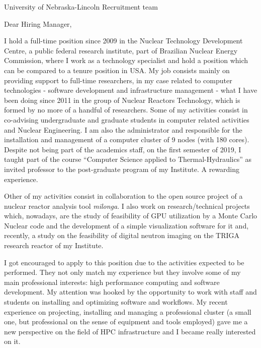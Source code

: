 \documentclass[11pt]{letter}
\begin{document}
\begin{letter}{University of Nebraska-Lincoln Recruitment team}

  \opening{Dear Hiring Manager,}
  
  I hold a full-time position since 2009 in the Nuclear Technology Development Centre, a public federal
  research institute, part of Brazilian Nuclear Energy Commission, where I work as a technology
  specialist and hold a position which can be compared to a tenure position in USA. My job consists mainly on
  providing support to full-time researchers, in my case
  related to computer technologies - software development and infrastructure management - what I have been
  doing since 2011 in the group of Nuclear Reactors Technology, which is formed by no more of a handful of researchers.
  Some of my activities consist in co-advising undergraduate and graduate students in computer related
  activities and Nuclear Engineering. I am also the administrator and responsible for the installation and management of a
  computer cluster of 9 nodes (with 180 cores). Despite not being part of the academics staff, on the first semester of 2019,
  I taught part of the course ``Computer Science applied to Thermal-Hydraulics'' as invited professor to the post-graduate 
  program of my Institute. A rewarding experience.

  Other of my activities consist in collaboration
  to the open source project of a nuclear reactor
  analysis tool \textit{milonga}. I also work on research/technical projects which, nowadays, are the study of
  feasibility of GPU utilization by a Monte Carlo Nuclear code and the development of
  a simple visualization software for it and, recently, a study on the feasibility of digital neutron imaging on
  the TRIGA research reactor of my Institute.
    
  I got encouraged to apply to this position due to the activities expected to be performed. They not only
  match my experience but they involve some of my main professional interests: high performance computing and
  software development. My attention was hooked by the opportunity to work with staff and students on installing
  and optimizing software and workflows. %
  My recent experience on projecting, installing and managing a professional
  cluster (a small one, but professional on the sense of equipment and tools employed) gave me a new perspective
  on the field of HPC infrastructure and I became really interested on it.
  

\end{letter}
\end{document}

